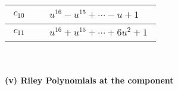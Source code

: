 \documentclass[1p]{elsarticle_modified}
\theoremstyle{definition}
\begin{document}
\begin{tabular}{m{50pt}|m{274pt}}
\hline $$\begin{aligned}c_{10}\end{aligned}$$&$\begin{aligned}
&u^{16}- u^{15}+\cdots- u+1
\end{aligned}$\\
\hline $$\begin{aligned}c_{11}\end{aligned}$$&$\begin{aligned}
&u^{16}+u^{15}+\cdots+6 u^2+1
\end{aligned}$\\
\hline
\end{tabular}\\~\\
\newpage\renewcommand{\arraystretch}{1}
\flushleft \textbf{(v) Riley Polynomials at the component}\newline \\
\end{document}
